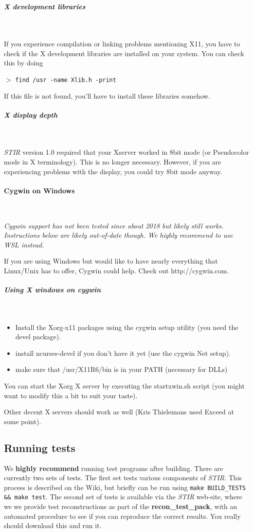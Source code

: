 \documentclass{article}
\newcommand{\subsubsubsection}[1]{\paragraph{#1}\mbox{} \\}
\newcommand{\subsubsubsubsection}[1]{\subparagraph{#1} \mbox{} \\}
\newcommand{\cmdline}[1]{\par \noindent $>$ \texttt{#1}\par}
\begin{document}
{ \subsubsubsubsection{X development libraries}
}

If you experience compilation 
or linking problems mentioning X11, you have to check if the 
X development libraries are installed on your system. You can 
check this by doing
\cmdline{find /usr -name Xlib.h -print}

If this file is not found, you'll have to install these libraries 
somehow.

{ \subsubsubsubsection{X display depth}
}

\textit{STIR} version 1.0 required that your Xserver worked in 8bit 
mode (or Pseudocolor mode in X terminology). This is no longer 
necessary. However, if you are experiencing problems with the 
display, you could try 8bit mode anyway.



{ \subsubsubsection{Cygwin on Windows}
}
\textit{Cygwin support has not been tested since about 2018 but likely still works. Instructions below are likely out-of-date though.
We highly recommend to use WSL instead.}

If you are using Windows but would like 
to have nearly everything that Linux/Unix has to offer, Cygwin could help. Check out http://cygwin.com.

{ \subsubsubsubsection{Using X windows on cygwin}
}
\begin{itemize}
\item Install the Xorg-x11 packages using the cygwin setup utility 
(you need the devel package).
\item 
install ncurses-devel if you don't have it yet (use the cygwin 
Net setup).
\item make sure that /usr/X11R6/bin is in your PATH (necessary 
for DLLs)
\end{itemize}

You can start the Xorg X server by executing the startxwin.sh 
script (you might want to modify this a bit to suit your taste). 

Other decent X servers should work as well (Kris Thielemans used Exceed at 
some point).


\subsection{
Running tests}

We \textbf{highly recommend} running test programs after building. There are currently two
sets of tests. The first set tests various components of
\textit{STIR}. This process is described on the Wiki, but briefly can
be run using \texttt{make BUILD\_TESTS \&\& make test}.
The second set of tests is available via the \textit{STIR} web-site, where we 
we provide test reconstructions as part of the
\textbf{recon\_test\_pack}, with an 
automated procedure to see if you can reproduce the correct results. 
You really should download this and run it.
\end{document}
